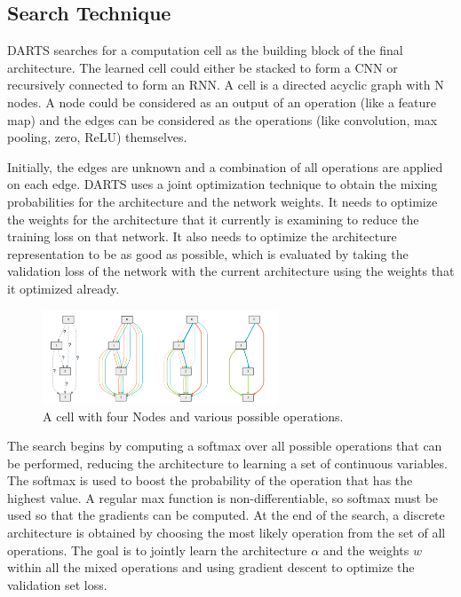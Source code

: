 \documentclass{ieee}
\begin{document}
\subsection{Search Technique}
DARTS searches for a computation cell as the building block of the final architecture. The learned cell could either be stacked to form a CNN or recursively connected to form an RNN. A cell is a directed acyclic graph with N nodes. A node could be considered as an output of an operation (like a feature map) and the edges can be considered as the operations (like convolution, max pooling, zero, ReLU) themselves. 

Initially, the edges are unknown and a combination of all operations are applied on each edge. DARTS uses a joint optimization technique to obtain the mixing probabilities for the architecture and the network weights. It needs to optimize the weights for the architecture that it currently is examining to reduce the training loss on that network. It also needs to optimize the architecture representation to be as good as possible, which is evaluated by taking the validation loss of the network with the current architecture using the weights that it optimized already. 
 \begin{figure}[h]
    \begin{center}
    \includegraphics[width=7cm]{images/DARTS.png}
    \end{center}
    \label{mbconv_fig}
    \caption{A cell with four Nodes and various possible operations. \cite{DARTSMODEL}}
\end{figure}

The search begins by computing a softmax over all possible operations that can be performed, reducing the architecture to learning a set of continuous variables. The softmax is used to boost the probability of the operation that has the highest value. A regular max function is non-differentiable, so softmax must be used so that the gradients can be computed. At the end of the search, a discrete architecture is obtained by choosing the most likely operation from the set of all operations. The goal is to jointly learn the architecture $\alpha$ and the weights $w$ within all the mixed operations and using gradient descent to optimize the validation set loss.
\end{document}
